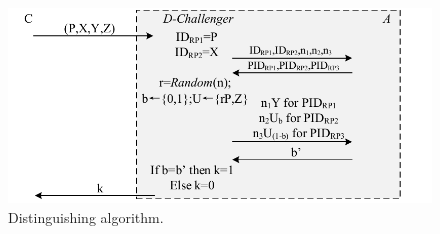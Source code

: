 \begin{figure}[t]
  \centering
  \includegraphics[width=1\linewidth]{fig/dalgorithm.pdf}
  \vspace{-5mm}
  \caption{Distinguishing algorithm.}
  \label{fig:dalgorithm}
  \vspace{-5mm}
\end{figure}